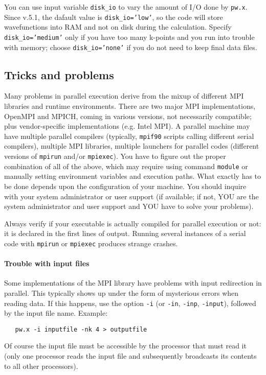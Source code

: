 \documentclass[12pt,a4paper]{article}
\def\pwx{\texttt{pw.x}}
\def\cpx{\texttt{cp.x}}
\begin{document}
You can use input variable \texttt{disk\_io} to vary the
amount of I/O done by \pwx. Since v.5.1, the dafault value is
\texttt{disk\_io='low'}, so the code will store wavefunctions
into RAM and not on disk during the calculation. Specify
\texttt{disk\_io='medium'} only if you have too many k-points
and you run into trouble with memory; choose \texttt{disk\_io='none'}
if you do not need to keep final data files.


\subsection{Tricks and problems}
\label{SubSec:badpara}

Many problems in parallel execution derive from the mixup of different
MPI libraries and runtime environments. There are two major MPI
implementations, OpenMPI and MPICH, coming in various versions,
not necessarily compatible; plus vendor-specific implementations
(e.g. Intel MPI). A parallel machine may have multiple parallel
compilers (typically, \texttt{mpif90} scripts calling different
serial compilers), multiple MPI libraries, multiple launchers
for parallel codes (different versions of \texttt{mpirun} and/or
\texttt{mpiexec}). You have to figure out the proper combination
of all of the above, which may require using command \texttt{module}
or manually setting environment variables and execution paths.
What exactly has to be done depends upon the configuration of your
machine. You should inquire with your system administrator or user
support (if available; if not, YOU are the system administrator
and user support and YOU have to solve your problems).

Always verify if your executable is actually compiled for
parallel execution or not: it is declared in the first lines
of output. Running several instances of a serial code with
\texttt{mpirun} or \texttt{mpiexec} produces strange crashes.

\paragraph{Trouble with input files}
Some implementations of the MPI library have problems with input
redirection in parallel. This typically shows up under the form of
mysterious errors when reading data. If this happens, use the option
\texttt{-i} (or \texttt{-in}, \texttt{-inp}, \texttt{-input}),
followed by the input file name.
Example:
\begin{verbatim}
   pw.x -i inputfile -nk 4 > outputfile
\end{verbatim}
Of course the
input file must be accessible by the processor that must read it
(only one processor reads the input file and subsequently broadcasts
its contents to all other processors).
\end{document}

